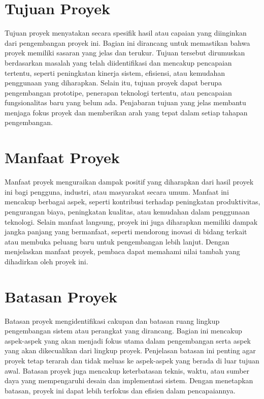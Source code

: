 \section{Tujuan Proyek}
Tujuan proyek menyatakan secara spesifik hasil atau capaian yang diinginkan dari pengembangan proyek ini. Bagian ini dirancang untuk memastikan bahwa proyek memiliki sasaran yang jelas dan terukur. Tujuan tersebut dirumuskan berdasarkan masalah yang telah diidentifikasi dan mencakup pencapaian tertentu, seperti peningkatan kinerja sistem, efisiensi, atau kemudahan penggunaan yang diharapkan. Selain itu, tujuan proyek dapat berupa pengembangan prototipe, penerapan teknologi tertentu, atau pencapaian fungsionalitas baru yang belum ada. Penjabaran tujuan yang jelas membantu menjaga fokus proyek dan memberikan arah yang tepat dalam setiap tahapan pengembangan.

\section{Manfaat Proyek}
Manfaat proyek menguraikan dampak positif yang diharapkan dari hasil proyek ini bagi pengguna, industri, atau masyarakat secara umum. Manfaat ini mencakup berbagai aspek, seperti kontribusi terhadap peningkatan produktivitas, pengurangan biaya, peningkatan kualitas, atau kemudahan dalam penggunaan teknologi. Selain manfaat langsung, proyek ini juga diharapkan memiliki dampak jangka panjang yang bermanfaat, seperti mendorong inovasi di bidang terkait atau membuka peluang baru untuk pengembangan lebih lanjut. Dengan menjelaskan manfaat proyek, pembaca dapat memahami nilai tambah yang dihadirkan oleh proyek ini.

\section{Batasan Proyek}
Batasan proyek mengidentifikasi cakupan dan batasan ruang lingkup pengembangan sistem atau perangkat yang dirancang. Bagian ini mencakup aspek-aspek yang akan menjadi fokus utama dalam pengembangan serta aspek yang akan dikecualikan dari lingkup proyek. Penjelasan batasan ini penting agar proyek tetap terarah dan tidak meluas ke aspek-aspek yang berada di luar tujuan awal. Batasan proyek juga mencakup keterbatasan teknis, waktu, atau sumber daya yang mempengaruhi desain dan implementasi sistem. Dengan menetapkan batasan, proyek ini dapat lebih terfokus dan efisien dalam pencapaiannya.

